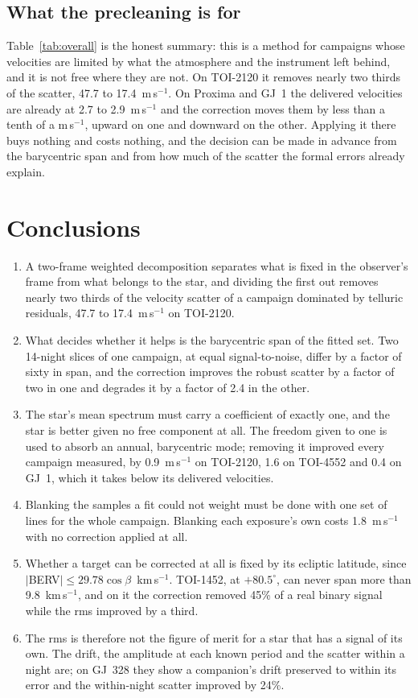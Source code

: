 \documentclass[11pt]{article}
\begin{document}
\subsection{What the precleaning is for}

Table~\ref{tab:overall} is the honest summary: this is a method for campaigns
whose velocities are limited by what the atmosphere and the instrument left
behind, and it is not free where they are not. On TOI-2120 it removes nearly two
thirds of the scatter, 47.7 to 17.4~m\,s$^{-1}$. On Proxima and GJ~1 the
delivered velocities are already at 2.7 to 2.9~m\,s$^{-1}$ and the correction
moves them by less than a tenth of a m\,s$^{-1}$, upward on one and downward on
the other. Applying it there buys nothing and costs nothing, and the decision can
be made in advance from the barycentric span and from how much of the scatter the
formal errors already explain.

\section{Conclusions}

\begin{enumerate}
\item A two-frame weighted decomposition separates what is fixed in the
observer's frame from what belongs to the star, and dividing the first out
removes nearly two thirds of the velocity scatter of a campaign dominated by
telluric residuals, 47.7 to 17.4~m\,s$^{-1}$ on TOI-2120.
\item What decides whether it helps is the barycentric span of the fitted set.
Two 14-night slices of one campaign, at equal signal-to-noise, differ by a
factor of sixty in span, and the correction improves the robust scatter by a
factor of two in one and degrades it by a factor of 2.4 in the other.
\item The star's mean spectrum must carry a coefficient of exactly one, and the
star is better given no free component at all. The freedom given to one is used
to absorb an annual, barycentric mode; removing it improved every campaign
measured, by 0.9~m\,s$^{-1}$ on TOI-2120, 1.6 on TOI-4552 and 0.4 on GJ~1, which
it takes below its delivered velocities.
\item Blanking the samples a fit could not weight must be done with one set of
lines for the whole campaign. Blanking each exposure's own costs
1.8~m\,s$^{-1}$ with no correction applied at all.
\item Whether a target can be corrected at all is fixed by its ecliptic
latitude, since $|$BERV$| \le 29.78\cos\beta$~km\,s$^{-1}$. TOI-1452, at
$+80.5^\circ$, can never span more than 9.8~km\,s$^{-1}$, and on it the
correction removed 45\% of a real binary signal while the rms improved by a
third.
\item The rms is therefore not the figure of merit for a star that has a signal
of its own. The drift, the amplitude at each known period and the scatter within
a night are; on GJ~328 they show a companion's drift preserved to within its
error and the within-night scatter improved by 24\%.
\end{enumerate}
\end{document}

